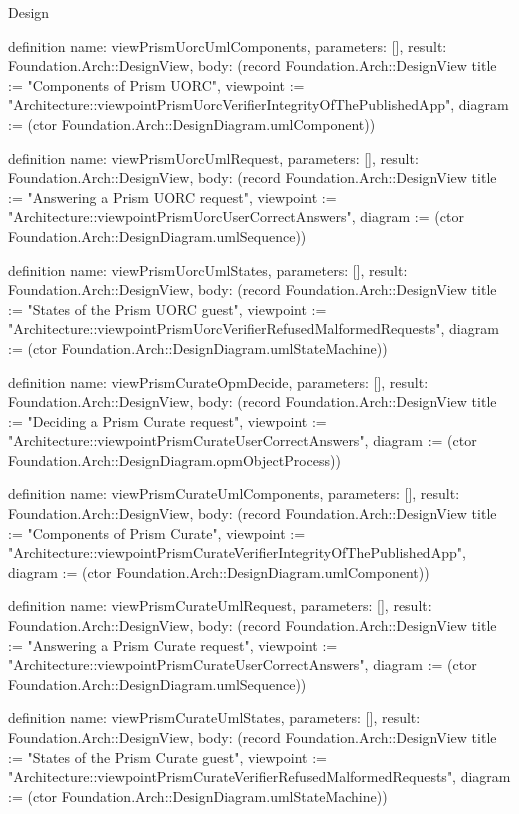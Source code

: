 \begin{lexlean}{Design}
\begin{semanticmodule}
definition{
  name: viewPrismUorcUmlComponents,
  parameters: [],
  result: Foundation.Arch::DesignView,
  body: (record Foundation.Arch::DesignView {title := "Components of Prism UORC", viewpoint := "Architecture::viewpointPrismUorcVerifierIntegrityOfThePublishedApp", diagram := (ctor Foundation.Arch::DesignDiagram.umlComponent)})
}

definition{
  name: viewPrismUorcUmlRequest,
  parameters: [],
  result: Foundation.Arch::DesignView,
  body: (record Foundation.Arch::DesignView {title := "Answering a Prism UORC request", viewpoint := "Architecture::viewpointPrismUorcUserCorrectAnswers", diagram := (ctor Foundation.Arch::DesignDiagram.umlSequence)})
}

definition{
  name: viewPrismUorcUmlStates,
  parameters: [],
  result: Foundation.Arch::DesignView,
  body: (record Foundation.Arch::DesignView {title := "States of the Prism UORC guest", viewpoint := "Architecture::viewpointPrismUorcVerifierRefusedMalformedRequests", diagram := (ctor Foundation.Arch::DesignDiagram.umlStateMachine)})
}

definition{
  name: viewPrismCurateOpmDecide,
  parameters: [],
  result: Foundation.Arch::DesignView,
  body: (record Foundation.Arch::DesignView {title := "Deciding a Prism Curate request", viewpoint := "Architecture::viewpointPrismCurateUserCorrectAnswers", diagram := (ctor Foundation.Arch::DesignDiagram.opmObjectProcess)})
}

definition{
  name: viewPrismCurateUmlComponents,
  parameters: [],
  result: Foundation.Arch::DesignView,
  body: (record Foundation.Arch::DesignView {title := "Components of Prism Curate", viewpoint := "Architecture::viewpointPrismCurateVerifierIntegrityOfThePublishedApp", diagram := (ctor Foundation.Arch::DesignDiagram.umlComponent)})
}

definition{
  name: viewPrismCurateUmlRequest,
  parameters: [],
  result: Foundation.Arch::DesignView,
  body: (record Foundation.Arch::DesignView {title := "Answering a Prism Curate request", viewpoint := "Architecture::viewpointPrismCurateUserCorrectAnswers", diagram := (ctor Foundation.Arch::DesignDiagram.umlSequence)})
}

definition{
  name: viewPrismCurateUmlStates,
  parameters: [],
  result: Foundation.Arch::DesignView,
  body: (record Foundation.Arch::DesignView {title := "States of the Prism Curate guest", viewpoint := "Architecture::viewpointPrismCurateVerifierRefusedMalformedRequests", diagram := (ctor Foundation.Arch::DesignDiagram.umlStateMachine)})
}


\end{semanticmodule}
\end{lexlean}
